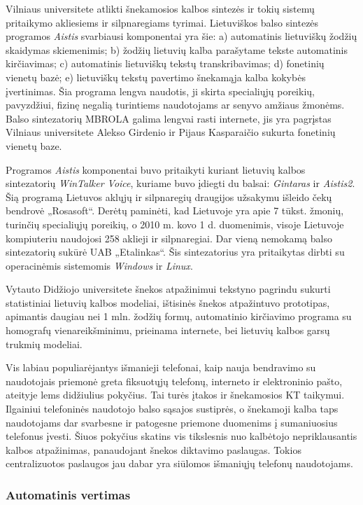 \begin{multicols}{2}
    Vilniaus universitete atlikti šnekamosios kalbos sintezės ir tokių sistemų pritaikymo akliesiems ir silpnaregiams tyrimai. Lietuviškos balso sintezės programos \textit{Aistis} svarbiausi komponentai yra šie: a) automatinis lietuviškų žodžių skaidymas skiemenimis; b) žodžių lietuvių kalba parašytame tekste automatinis kirčiavimas; c) automatinis lietuviškų tekstų transkribavimas; d) fonetinių vienetų bazė; e) lietuviškų tekstų pavertimo šnekamąja kalba kokybės įvertinimas. Šia programa lengva naudotis, ji skirta specialiųjų poreikių, pavyzdžiui, fizinę negalią turintiems naudotojams ar senyvo amžiaus žmonėms. Balso sintezatorių MBROLA galima lengvai rasti internete, jis yra pagrįstas Vilniaus universitete Alekso Girdenio ir Pijaus Kasparaičio sukurta fonetinių vienetų baze.   

    Programos \textit{Aistis}  komponentai buvo pritaikyti kuriant lietuvių kalbos sintezatorių \textit{WinTalker Voice}, kuriame buvo įdiegti du balsai: \textit{Gintaras}  ir \textit{Aistis2}. Šią programą Lietuvos aklųjų ir silpnaregių draugijos užsakymu išleido čekų bendrovė „Rosasoft“. Derėtų paminėti, kad Lietuvoje yra apie 7 tūkst. žmonių, turinčių specialiųjų poreikių, o 2010 m. kovo 1 d. duomenimis, visoje Lietuvoje kompiuteriu naudojosi 258 aklieji ir silpnaregiai. Dar vieną nemokamą balso sintezatorių sukūrė UAB „Etalinkas“.  Šis sintezatorius yra pritaikytas dirbti su operacinėmis sistemomis \textit{Windows} ir \textit{Linux}.

Vytauto Didžiojo universitete šnekos atpažinimui tekstyno pagrindu sukurti statistiniai lietuvių kalbos modeliai, ištisinės šnekos atpažintuvo prototipas, apimantis daugiau nei 1 mln. žodžių formų, automatinio kirčiavimo programa su homografų vienareikšminimu, prieinama internete, bei lietuvių kalbos garsų trukmių modeliai.

Vis labiau populiarėjantys išmanieji telefonai, kaip nauja bendravimo su naudotojais priemonė greta fiksuotųjų telefonų, interneto ir elektroninio pašto, ateityje lems didžiulius pokyčius. Tai turės įtakos ir šnekamosios KT taikymui. Ilgainiui telefoninės naudotojo balso sąsajos sustiprės, o šnekamoji kalba taps naudotojams dar svarbesne ir patogesne priemone duomenims į sumaniuosius telefonus įvesti. Šiuos pokyčius skatins vis tikslesnis nuo kalbėtojo nepriklausantis kalbos atpažinimas, panaudojant šnekos diktavimo paslaugas. Tokios centralizuotos paslaugos jau dabar yra siūlomos išmaniųjų telefonų naudotojams.

\subsubsection{Automatinis vertimas}


\end{multicols}
